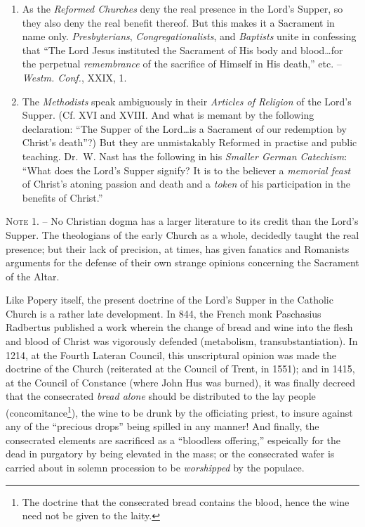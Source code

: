 \documentclass[
]{book}
\begin{document}
\begin{enumerate}
\def\labelenumi{\arabic{enumi}.}
\item
  As the \emph{Reformed Churches} deny the real presence in the Lord's Supper, so they also deny the real benefit thereof. But this makes it a Sacrament in name only. \emph{Presbyterians}, \emph{Congregationalists}, and \emph{Baptists} unite in confessing that ``The Lord Jesus instituted the Sacrament of His body and blood\ldots for the perpetual \emph{remembrance} of the sacrifice of Himself in His death,'' etc. -- \emph{Westm. Conf.}, XXIX, 1.
\item
  The \emph{Methodists} speak ambiguously in their \emph{Articles of Religion} of the Lord's Supper. (Cf. XVI and XVIII. And what is memant by the following declaration: ``The Supper of the Lord\ldots is a Sacrament of our redemption by Christ's death''?) But they are unmistakably Reformed in practise and public teaching. Dr.~W. Nast has the following in his \emph{Smaller German Catechism}: ``What does the Lord's Supper signify? It is to the believer a \emph{memorial feast} of Christ's atoning passion and death and a \emph{token} of his participation in the benefits of Christ.''
\end{enumerate}

\textsc{Note 1. --} No Christian dogma has a larger literature to its credit than the Lord's Supper. The theologians of the early Church as a whole, decidedly taught the real presence; but their lack of precision, at times, has given fanatics and Romanists arguments for the defense of their own strange opinions concerning the Sacrament of the Altar.

Like Popery itself, the present doctrine of the Lord's Supper in the Catholic Church is a rather late development. In 844, the French monk Paschasius Radbertus published a work wherein the change of bread and wine into the flesh and blood of Christ was vigorously defended (metabolism, transubstantiation). In 1214, at the Fourth Lateran Council, this unscriptural opinion was made the doctrine of the Church (reiterated at the Council of Trent, in 1551); and in 1415, at the Council of Constance (where John Hus was burned), it was finally decreed that the consecrated \emph{bread alone} should be distributed to the lay people (concomitance\footnote{The doctrine that the consecrated bread contains the blood, hence the wine need not be given to the laity.}), the wine to be drunk by the officiating priest, to insure against any of the ``precious drops'' being spilled in any manner! And finally, the consecrated elements are sacrificed as a ``bloodless offering,'' espeically for the dead in purgatory by being elevated in the mass; or the consecrated wafer is carried about in solemn procession to be \emph{worshipped} by the populace.
\end{document}
